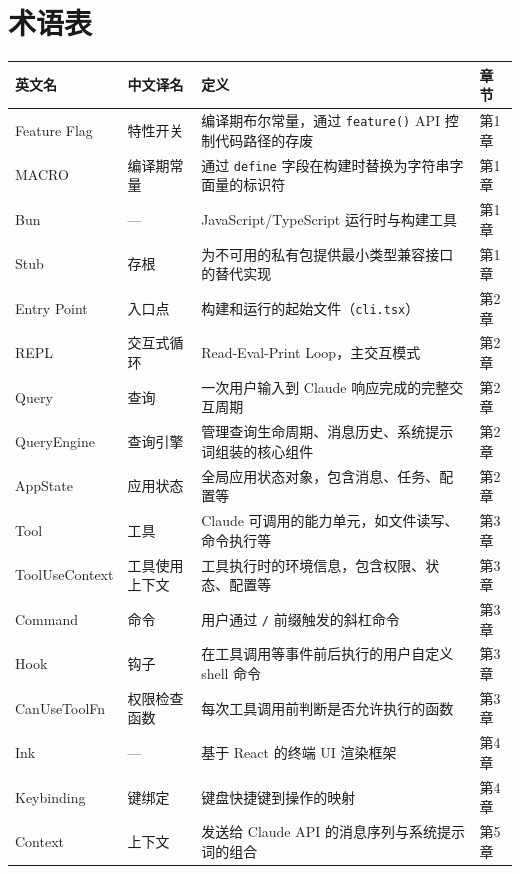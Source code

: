 \chapter{术语表}

{\small\setlength{\LTleft}{0pt}\setlength{\LTright}{0pt}
\begin{longtable}{@{}p{2.8cm}p{1.8cm}p{6.2cm}p{1.2cm}@{}}
\toprule
\textbf{英文名} & \textbf{中文译名} & \textbf{定义} & \textbf{章节} \\
\midrule
\endhead
Feature Flag & 特性开关 & 编译期布尔常量，通过 \texttt{feature()} API 控制代码路径的存废 & 第1章 \\
\addlinespace
MACRO & 编译期常量 & 通过 \texttt{define} 字段在构建时替换为字符串字面量的标识符 & 第1章 \\
\addlinespace
Bun & — & JavaScript/TypeScript 运行时与构建工具 & 第1章 \\
\addlinespace
Stub & 存根 & 为不可用的私有包提供最小类型兼容接口的替代实现 & 第1章 \\
\addlinespace
Entry Point & 入口点 & 构建和运行的起始文件（\texttt{cli.tsx}） & 第2章 \\
\addlinespace
REPL & 交互式循环 & Read-Eval-Print Loop，主交互模式 & 第2章 \\
\addlinespace
Query & 查询 & 一次用户输入到 Claude 响应完成的完整交互周期 & 第2章 \\
\addlinespace
QueryEngine & 查询引擎 & 管理查询生命周期、消息历史、系统提示词组装的核心组件 & 第2章 \\
\addlinespace
AppState & 应用状态 & 全局应用状态对象，包含消息、任务、配置等 & 第2章 \\
\addlinespace
Tool & 工具 & Claude 可调用的能力单元，如文件读写、命令执行等 & 第3章 \\
\addlinespace
ToolUseContext & 工具使用上下文 & 工具执行时的环境信息，包含权限、状态、配置等 & 第3章 \\
\addlinespace
Command & 命令 & 用户通过 \texttt{/} 前缀触发的斜杠命令 & 第3章 \\
\addlinespace
Hook & 钩子 & 在工具调用等事件前后执行的用户自定义 shell 命令 & 第3章 \\
\addlinespace
CanUseToolFn & 权限检查函数 & 每次工具调用前判断是否允许执行的函数 & 第3章 \\
\addlinespace
Ink & — & 基于 React 的终端 UI 渲染框架 & 第4章 \\
\addlinespace
Keybinding & 键绑定 & 键盘快捷键到操作的映射 & 第4章 \\
\addlinespace
Context & 上下文 & 发送给 Claude API 的消息序列与系统提示词的组合 & 第5章 \\

\end{longtable}}
